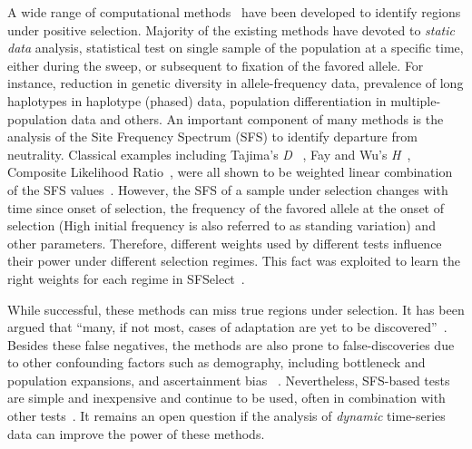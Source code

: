 \documentclass[11pt]{article}
\begin{document}
A wide range of computational methods~\cite{vitti2013detecting} have
been developed to identify regions under positive selection. Majority of the 
existing
methods have devoted to \emph{static data} analysis, statistical test on single 
sample of the
population at a specific time, either during the sweep, or subsequent
to fixation of the favored allele. For instance, reduction in genetic
diversity\cite{tajima1989statistical,fay2000hitchhiking,ronen2013learning}
in allele-frequency data, prevalence of long haplotypes
\cite{sabeti2006positive,vitti2013detecting} in haplotype (phased)
data, population differentiation
\cite{holsinger2009genetics,burke2010genome} in multiple-population
data and others. An important component of many methods is the
analysis of the Site Frequency Spectrum (SFS) to identify departure
from neutrality. Classical examples including Tajima's \emph{D}
~\cite{tajima1989statistical}, Fay and Wu's
\emph{H}~\cite{fay2000hitchhiking}, Composite Likelihood
Ratio~\cite{nielsen2005genomic}, were all shown to be weighted linear
combination of the SFS values~\cite{achaz2009frequency}. However, the
SFS of a sample under selection changes with time since onset of
selection, the frequency of the favored allele at the onset of
selection (High initial frequency is also referred to as standing
variation) and other parameters. Therefore, different weights used by
different tests influence their power under different selection
regimes. This fact was exploited to learn the right weights for each
regime in SFSelect~\cite{ronen2013learning}.

While successful, these methods can miss true regions under
selection. It has been argued that ``many, if not most, cases of
adaptation are yet to be
discovered''~\cite{messer2013population}. Besides these false
negatives, the methods are also prone to false-discoveries due to
other confounding factors such as demography, including bottleneck and
population expansions, and ascertainment bias ~\cite{ptak2002evidence,
  ramos2002statistical,akey2009constructing,
  nielsen2003correcting,messer2013population}. Nevertheless, SFS-based
tests are simple and inexpensive and continue to be used, often in
combination with other
tests~\cite{akey2009constructing,vitti2013detecting}. It remains an
open question if the analysis of \emph{dynamic} time-series data can
improve the power of these methods.
\end{document}
